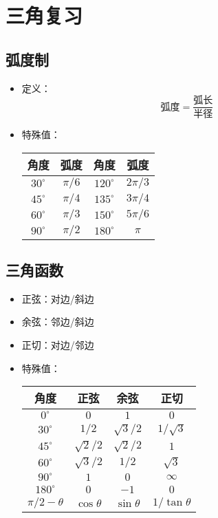 
\section{三角复习}

\subsection{弧度制}

\begin{itemize}
    \item 定义：
    \begin{equation*}
        \textrm{弧度}=\frac{\textrm{弧长}}{\textrm{半径}}
    \end{equation*}
    \item 特殊值：
    \begin{center}
        \renewcommand\arraystretch{1.2}
        \begin{tabular}{c|c|c|c}
            \hline
            角度&弧度&角度&弧度\\\hline
            $30^\circ$&$\pi/6$&$120^\circ$&$2\pi/3$\\
            $45^\circ$&$\pi/4$&$135^\circ$&$3\pi/4$\\
            $60^\circ$&$\pi/3$&$150^\circ$&$5\pi/6$\\
            $90^\circ$&$\pi/2$&$180^\circ$&$\pi$\\
            \hline
        \end{tabular}
    \end{center}
\end{itemize}

\subsection{三角函数}

\begin{itemize}
    \item 正弦：对边/斜边
    \item 余弦：邻边/斜边
    \item 正切：对边/邻边
    \item 特殊值：
    \begin{center}
        \renewcommand\arraystretch{1.2}
        \begin{tabular}{c|ccc}
            \hline
            角度&正弦&余弦&正切\\\hline
            $0^\circ$&$0$&$1$&$0$\\
            $30^\circ$&$1/2$&$\sqrt3/2$&$1/\sqrt3$\\
            $45^\circ$&$\sqrt2/2$&$\sqrt2/2$&$1$\\
            $60^\circ$&$\sqrt3/2$&$1/2$&$\sqrt3$\\
            $90^\circ$&$1$&$0$&$\infty$\\
            $180^\circ$&$0$&$-1$&$0$\\
            $\pi/2-\theta$&$\cos\theta$&$\sin\theta$&$1/\tan\theta$\\
            \hline
        \end{tabular}
    \end{center}
\end{itemize}

